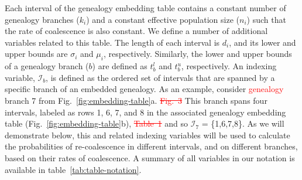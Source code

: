 \documentclass[11pt]{article}
\begin{document}
Each interval of the genealogy embedding table contains a constant number
of genealogy branches ($k_i$) and a constant effective population size 
($n_i$) such that the rate of coalescence is also constant.
We define a number of additional variables related to this table. 
The length of each interval is $d_i$, and its lower and upper bounds 
are $\sigma_i$ and $\mu_i$, respectively. Similarly, the lower and upper 
bounds of a genealogy branch ($b$) are defined as $t_b^l$ and $t_b^u$, 
respectively. 
An indexing variable, $\mathcal{I}_b$, is defined as the
ordered set of intervals that are spanned by a specific branch
of an embedded genealogy. As an example, consider 
\textcolor{red}{genealogy}
branch 7 from 
% 
Fig.~\ref{fig:embedding-table}a.
% 
\textcolor{red}{\sout{Fig.~3}}
This branch spans four intervals, 
labeled as rows 1, 6, 7, and 8 in
the associated genealogy embedding table
(Fig.~\ref{fig:embedding-table}b),
% 
\textcolor{red}{\sout{Table~1}}
% 
and so $\mathcal{I}_7$ = \{1,6,7,8\}. As we will
demonstrate below, this and related indexing variables will be
used to calculate the probabilities of re-coalescence in different
intervals, and on different branches, based on their rates of 
coalescence.
A summary of all variables in our notation is available in 
table~\ref{tab:table-notation}. 

\end{document}
